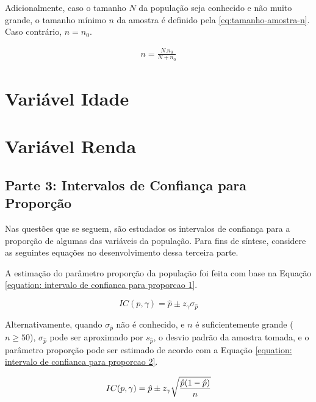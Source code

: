 \documentclass[10pt,a4paper,oneside]{article}
\begin{document}
	Adicionalmente, caso o tamanho $N$ da população seja conhecido e não muito grande,
	o tamanho mínimo $n$ da amostra é definido pela \autoref{eq:tamanho-amostra-n}.
	Caso contrário, $n = n_{0}$.

	\begin{align}
		\label{eq:tamanho-amostra-n}
		n = \frac{N . n_0}{N + n_0}
	\end{align}
	

\section{Variável Idade}
\label{questao:2}


\section{Variável Renda}
\label{questao:3}


\newpage
\begin{center}
	\section*{Parte 3: Intervalos de Confiança para Proporção}
\end{center}

	Nas questões que se seguem, são estudados os intervalos de confiança
	para a proporção de algumas das variáveis da população. Para fins de
	síntese, considere as seguintes equações no desenvolvimento dessa
	terceira parte.
	
	A estimação do parâmetro proporção da população foi feita com base na
	Equação \ref{equation: intervalo de confianca para proporcao 1}.

		\begin{equation}
			IC(p, \gamma) = \hat{p} \pm z_\gamma \sigma_{\hat{p}}
			\label{equation: intervalo de confianca para proporcao 1}
		\end{equation}
	
	Alternativamente, quando $\sigma_{\hat{p}}$ não é conhecido, e $n$ é
	suficientemente grande ($n \geq 50$), $\sigma_{\hat{p}}$ pode
	ser aproximado por $s_{\hat{p}}$, o desvio padrão da amostra tomada, e o
	parâmetro proporção pode ser estimado de acordo com a Equação
	\ref{equation: intervalo de confianca para proporcao 2}.

		\begin{equation}
			IC(p, \gamma) = \hat{p} \pm z_\gamma \sqrt{\frac{\hat{p}(1-\hat{p})}{n}} \\
			\label{equation: intervalo de confianca para proporcao 2}
		\end{equation}
	
\end{document}
